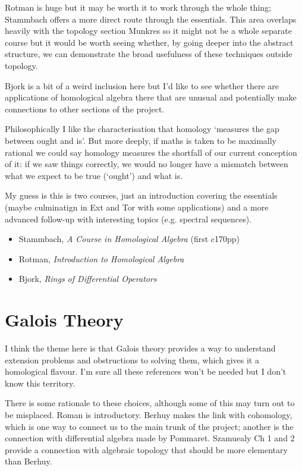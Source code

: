 \documentclass[article]{article}
\begin{document}
Rotman is huge but it may be worth it to work through the whole thing; Stammbach offers a more direct route through the essentials. This area overlaps heavily with the topology section Munkres so it might not be a whole separate course but it would be worth seeing whether, by going deeper into the abstract structure, we can demonstrate the broad usefulness of these techniques outside topology.

Bjork is a bit of a weird inclusion here but I'd like to see whether there are applications of homological algebra there that are unusual and potentially make connections to other sections of the project.

Philosophically I like the characterisation that homology `measures the gap between ought and is'. But more deeply, if maths is taken to be maximally rational we could say homology measures the shortfall of our current conception of it: if we saw things correctly, we would no longer have a mismatch between what we expect to be true (`ought') and what is.

My guess is this is two courses, just an introduction covering the essentials (maybe culminatign in Ext and Tor with some applications) and a more advanced follow-up with interesting topics (e.g. spectral sequences).

\begin{itemize}
	\item[]{Stammbach, \textit{A Course in Homological Algebra} (first c170pp)}
	\item[]{Rotman, \textit{Introduction to Homological Algebra}}
	\item[]{Bjork, \textit{Rings of Differential Operators}}
\end{itemize}

\section{Galois Theory}

I think the theme here is that Galois theory provides a way to understand extension problems and obstructions to solving them, which gives it a homological flavour. I'm sure all these references won't be needed but I don't know this territory.

There is some rationale to these choices, although some of this may turn out to be misplaced. Roman is introductory. Berhuy makes the link with cohomology, which is one way to connect us to the main trunk of the project; another is the connection with differential algebra made by Pommaret. Szamuealy Ch 1 and 2 provide a connection with algebraic topology that should be more elementary than Berhuy.
\end{document}
